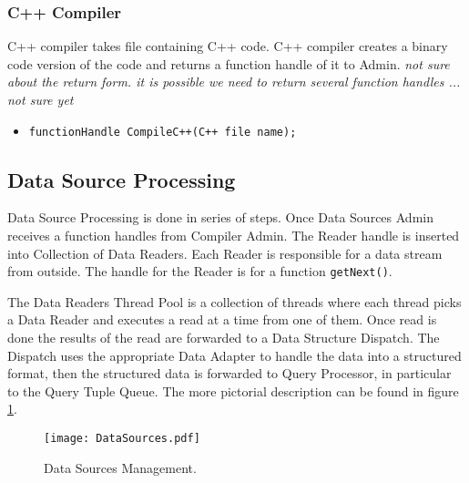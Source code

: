 \documentclass[11pt]{article}
\begin{document}
\subsubsection{C++ Compiler}

C++ compiler takes file containing C++ code. C++ compiler creates a binary code version of the code and returns a function handle of it to Admin. \emph{not sure about the return form. it is possible we need to return several function handles ... not sure yet}

\begin{itemize}
	\item {\tt functionHandle CompileC++(C++ file name);}
\end{itemize}

\subsection{Data Source Processing}

Data Source Processing is done in series of steps. Once Data Sources Admin receives a function handles from Compiler Admin. The Reader handle is inserted into Collection of Data Readers. Each Reader is responsible for a data stream from outside. The handle for the Reader is for a function {\tt getNext()}.

The Data Readers Thread Pool is a collection of threads where each thread picks a Data Reader and executes a read at a time from one of them. Once read is done the results of the read are forwarded to a Data Structure Dispatch. The Dispatch uses the appropriate Data Adapter to handle the data into a structured format, then the structured data is forwarded to Query Processor, in particular to the Query Tuple Queue. The more pictorial description can be found in figure \ref{DataSourcePic}.


\begin{figure}
  \texttt{[image: DataSources.pdf]}
  \caption{Data Sources Management.}
  \label{DataSourcePic}
\end{figure}
\end{document}
